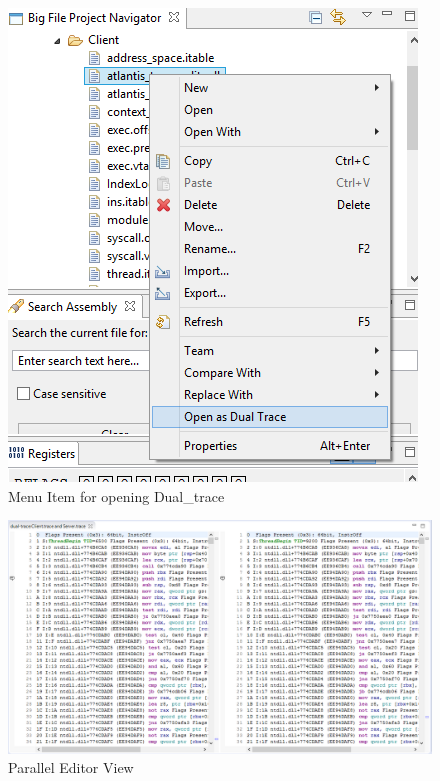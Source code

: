 \begin{figure}[H]
\centerline{\includegraphics[scale=0.55]{Figures/opendualtracemenu}}
 \caption{Menu Item for opening Dual\_trace}
\label{opendualtracemenu}
\end{figure}

\begin{figure}[H]
\centerline{\includegraphics[scale=0.6]{Figures/paralleleditor}}
 \caption{Parallel Editor View}
\label{paralleleditor}
\end{figure}



